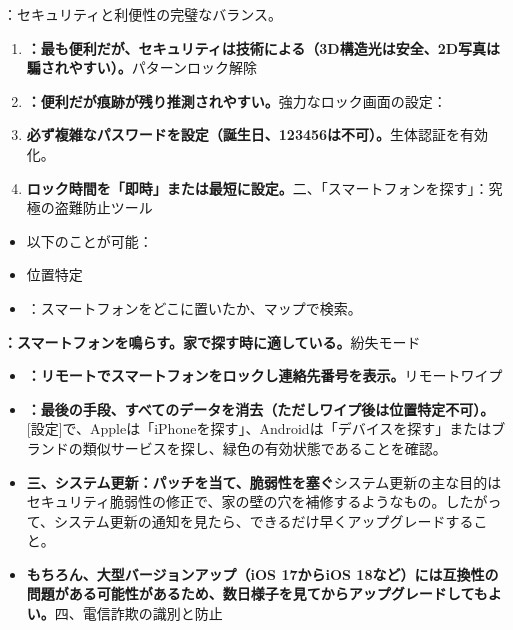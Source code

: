 


：セキュリティと利便性の完璧なバランス。


\begin{enumerate}
  \item \textbf{：最も便利だが、セキュリティは技術による（3D構造光は安全、2D写真は騙されやすい）。}パターンロック解除
  \item \textbf{：便利だが痕跡が残り推測されやすい。}強力なロック画面の設定：
  \item \textbf{必ず複雑なパスワードを設定（誕生日、123456は不可）。}生体認証を有効化。
  \item \textbf{ロック時間を「即時」または最短に設定。}二、「スマートフォンを探す」：究極の盗難防止ツール
\end{enumerate}


\begin{itemize}
  \item 以下のことが可能：
  \item 位置特定
  \item ：スマートフォンをどこに置いたか、マップで検索。
\end{itemize}


\textbf{：スマートフォンを鳴らす。家で探す時に適している。}紛失モード

\begin{itemize}
  \item \textbf{：リモートでスマートフォンをロックし連絡先番号を表示。}リモートワイプ
  \item \textbf{：最後の手段、すべてのデータを消去（ただしワイプ後は位置特定不可）。}[設定]で、Appleは「iPhoneを探す」、Androidは「デバイスを探す」またはブランドの類似サービスを探し、緑色の有効状態であることを確認。
  \item \textbf{三、システム更新：パッチを当て、脆弱性を塞ぐ}システム更新の主な目的はセキュリティ脆弱性の修正で、家の壁の穴を補修するようなもの。したがって、システム更新の通知を見たら、できるだけ早くアップグレードすること。
  \item \textbf{もちろん、大型バージョンアップ（iOS 17からiOS 18など）には互換性の問題がある可能性があるため、数日様子を見てからアップグレードしてもよい。}四、電信詐欺の識別と防止
\end{itemize}


